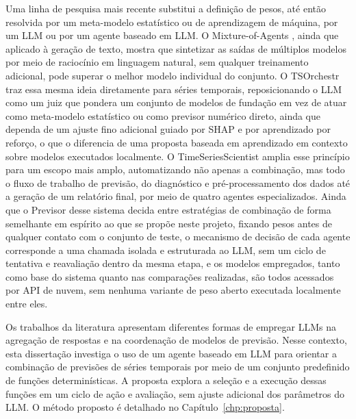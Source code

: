 Uma linha de pesquisa mais recente substitui a definição de pesos, até então resolvida por um meta-modelo estatístico ou de aprendizagem de máquina, por um LLM ou por um agente baseado em LLM. O Mixture-of-Agents \citep{wang2024moa}, ainda que aplicado à geração de texto, mostra que sintetizar as saídas de múltiplos modelos por meio de raciocínio em linguagem natural, sem qualquer treinamento adicional, pode superar o melhor modelo individual do conjunto. O TSOrchestr \citep{cao2025tsorchestr} traz essa mesma ideia diretamente para séries temporais, reposicionando o LLM como um juiz que pondera um conjunto de modelos de fundação em vez de atuar como meta-modelo estatístico ou como previsor numérico direto, ainda que dependa de um ajuste fino adicional guiado por SHAP e por aprendizado por reforço, o que o diferencia de uma proposta baseada em aprendizado em contexto sobre modelos executados localmente. O TimeSeriesScientist \citep{zhao2025timeseriesscientist} amplia esse princípio para um escopo mais amplo, automatizando não apenas a combinação, mas todo o fluxo de trabalho de previsão, do diagnóstico e pré-processamento dos dados até a geração de um relatório final, por meio de quatro agentes especializados. Ainda que o Previsor desse sistema decida entre estratégias de combinação de forma semelhante em espírito ao que se propõe neste projeto, fixando pesos antes de qualquer contato com o conjunto de teste, o mecanismo de decisão de cada agente corresponde a uma chamada isolada e estruturada ao LLM, sem um ciclo de tentativa e reavaliação dentro da mesma etapa, e os modelos empregados, tanto como base do sistema quanto nas comparações realizadas, são todos acessados por API de nuvem, sem nenhuma variante de peso aberto executada localmente entre eles.

Os trabalhos da literatura apresentam diferentes formas de empregar LLMs na agregação de respostas e na coordenação de modelos de previsão. Nesse contexto, esta dissertação investiga o uso de um agente baseado em LLM para orientar a combinação de previsões de séries temporais por meio de um conjunto predefinido de funções determinísticas. A proposta explora a seleção e a execução dessas funções em um ciclo de ação e avaliação, sem ajuste adicional dos parâmetros do LLM. O método proposto é detalhado no Capítulo~\ref{chp:proposta}.
